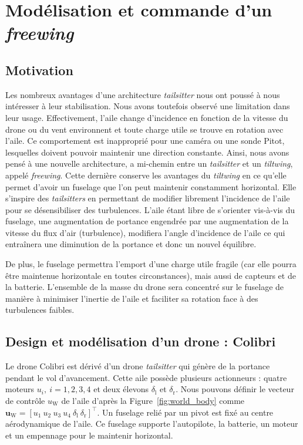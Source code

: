 
\chapter{Modélisation et commande d'un \textit{freewing}}
\minitoc
\label{chap:colibri}

\section{Motivation}
\label{sec:motivationcolibri}
Les nombreux avantages d'une architecture \textit{tailsitter} nous ont poussé à nous intéresser à leur stabilisation. Nous avons toutefois observé une limitation dans leur usage. Effectivement, l'aile change d'incidence en fonction de la vitesse du drone ou du vent environnent et toute charge utile se trouve en rotation avec l'aile. Ce comportement est inapproprié pour une caméra ou une sonde Pitot, lesquelles doivent pouvoir maintenir une direction constante. Ainsi, nous avons pensé à une nouvelle architecture, a mi-chemin entre un \textit{tailsitter} et un \textit{tiltwing}, appelé \textit{freewing}. Cette dernière conserve les avantages du \textit{tiltwing} en ce qu'elle permet d'avoir un fuselage que l'on peut maintenir constamment horizontal. Elle s'inspire des \textit{tailsitters} en permettant de modifier librement l'incidence de l'aile pour se désensibiliser des turbulences. L'aile étant libre de s'orienter vis-à-vis du fuselage, une augmentation de portance engendrée par une augmentation de la vitesse du flux d'air (turbulence), modifiera l'angle d'incidence de l'aile ce qui entraînera une diminution de la portance et donc un nouvel équilibre.

De plus, le fuselage permettra l'emport d'une charge utile fragile (car elle pourra être maintenue horizontale en toutes circonstances), mais aussi de capteurs et de la batterie. L'ensemble de la masse du drone sera concentré sur le fuselage de manière à minimiser l'inertie de l'aile et faciliter sa rotation face à des turbulences faibles.

\section{Design et modélisation d'un drone : Colibri}
\label{sec:model_colibri}

Le drone Colibri est dérivé d'un drone \textit{tailsitter} qui génère de la portance pendant le vol d'avancement. Cette aile possède plusieurs actionneurs : quatre moteurs $u_{i}, ~i = 1,2,3,4$ et deux élevons $\delta_{\text{l}}$ et $\delta_{\text{r}}$. Nous pouvons définir le vecteur de contrôle $u_{\text{W}}$ de l'aile d'après la Figure~\ref{fig:world_body} comme $\boldsymbol{u}_{\text{W}} = [u_{1}~u_{2}~u_{3}~u_{4}~\delta_{\text{l}}~\delta_{\text{r}}]^\top$. Un fuselage relié par un pivot est fixé au centre aérodynamique de l'aile. Ce fuselage supporte l'autopilote, la batterie, un moteur et un empennage pour le maintenir horizontal.

